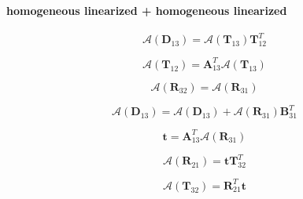 \paragraph{homogeneous linearized + homogeneous linearized}
\label{sec:adding-downward-adjoint_of_tangent_linear-homogeneous_linearized_p_homogeneous_linearized}

\begin{equation}
\mathcal{A}(\mathbf{D}_{13}) = \mathcal{A}(\mathbf{T}_{13})\mathbf{T}^{T}_{12}
\label{eq:adding-downward-adjoint_of_tangent_linear-homogeneous_linearized_p_homogeneous_linearized-D13_a}
\end{equation}

\begin{equation}
\mathcal{A}(\mathbf{T}_{12}) = \mathbf{A}^{T}_{13}\mathcal{A}(\mathbf{T}_{13})
\label{eq:adding-downward-adjoint_of_tangent_linear-homogeneous_linearized_p_homogeneous_linearized-T12_a}
\end{equation}

\begin{equation}
\mathcal{A}(\mathbf{R}_{32}) = \mathcal{A}(\mathbf{R}_{31})
\label{eq:adding-downward-adjoint_of_tangent_linear-homogeneous_linearized_p_homogeneous_linearized-R32_a}
\end{equation}

\begin{equation}
\mathcal{A}(\mathbf{D}_{13}) = \mathcal{A}(\mathbf{D}_{13}) + \mathcal{A}(\mathbf{R}_{31})\mathbf{B}^{T}_{31}
\label{eq:adding-downward-adjoint_of_tangent_linear-homogeneous_linearized_p_homogeneous_linearized-D13_a2}
\end{equation}

\begin{equation}
\mathbf{t} = \mathbf{A}^{T}_{13}\mathcal{A}(\mathbf{R}_{31})
\label{eq:adding-downward-adjoint_of_tangent_linear-homogeneous_linearized_p_homogeneous_linearized-t}
\end{equation}

\begin{equation}
\mathcal{A}(\mathbf{R}_{21}) = \mathbf{t}\mathbf{T}^{T}_{32}
\label{eq:adding-downward-adjoint_of_tangent_linear-homogeneous_linearized_p_homogeneous_linearized-R21_a}
\end{equation}

\begin{equation}
\mathcal{A}(\mathbf{T}_{32}) = \mathbf{R}^{T}_{21}\mathbf{t}
\label{eq:adding-downward-adjoint_of_tangent_linear-homogeneous_linearized_p_homogeneous_linearized-T32_a}
\end{equation}

